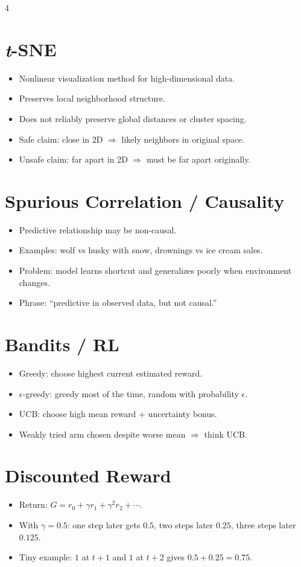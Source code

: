 \documentclass[11pt,landscape]{article}
\begin{document}
\begin{multicols}{4}
		\section{\textit{t}-SNE}
		\begin{itemize}
			\item Nonlinear visualization method for high-dimensional data.
			\item Preserves local neighborhood structure.
			\item Does not reliably preserve global distances or cluster spacing.
			\item Safe claim: close in 2D $\Rightarrow$ likely neighbors in original space.
			\item Unsafe claim: far apart in 2D $\Rightarrow$ must be far apart originally.
		\end{itemize}
		
		\section{Spurious Correlation / Causality}
		\begin{itemize}
			\item Predictive relationship may be non-causal.
			\item Examples: wolf vs husky with snow, drownings vs ice cream sales.
			\item Problem: model learns shortcut and generalizes poorly when environment changes.
			\item Phrase: ``predictive in observed data, but not causal.''
		\end{itemize}
		
		\section{Bandits / RL}
		\begin{itemize}
			\item Greedy: choose highest current estimated reward.
			\item $\epsilon$-greedy: greedy most of the time, random with probability $\epsilon$.
			\item UCB: choose high mean reward + uncertainty bonus.
			\item Weakly tried arm chosen despite worse mean $\Rightarrow$ think UCB.
		\end{itemize}
		
		\section{Discounted Reward}
		\begin{itemize}
			\item Return: $G=r_0+\gamma r_1+\gamma^2 r_2+\cdots$.
			\item With $\gamma=0.5$: one step later gets $0.5$, two steps later $0.25$, three steps later $0.125$.
			\item Tiny example: $1$ at $t+1$ and $1$ at $t+2$ gives $0.5+0.25=0.75$.
		\end{itemize}
		

\end{multicols}
\end{document}
